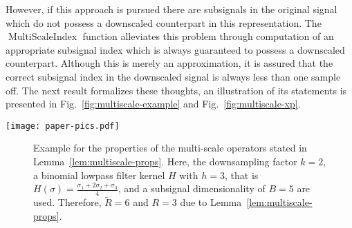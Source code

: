 \documentclass[journal]{IEEEtran}
\DeclareMathOperator{\Subsignal}{Subsignal}
\DeclareMathOperator{\SubsignalPad}{SubsignalPad}
\DeclareMathOperator{\MultiScaleSubsignal}{MultiScaleSubsignal}
\DeclareMathOperator{\MultiScaleIndex}{MultiScaleIndex}
\begin{document}
However, if this approach is pursued there are subsignals in the original signal which do not possess a downscaled counterpart in this representation.
The $\MultiScaleIndex$ function alleviates this problem through computation of an appropriate subsignal index which is always guaranteed to possess a downscaled counterpart.
Although this is merely an approximation, it is assured that the correct subsignal index in the downscaled signal is always less than one sample off.
The next result formalizes these thoughts, an illustration of its statements is presented in Fig.~\ref{fig:multiscale-example} and Fig.~\ref{fig:multiscale-xp}.

\begin{figure*}[t]
  \centering
  \texttt{[image: paper-pics.pdf]}
  \caption{Illustration of the multi-scale analysis approach detailed in Lemma~\ref{lem:multiscale-props} for image processing as an example.
    The original image (gray area on the left-hand side) is padded with $R$ pixels (orange area) using Neumann boundary conditions.
    Downscaling of the padded image with a scale factor of $k = 3$ yields the small image on the right-hand side.
    The red area in the original image is a region of interest with $B$ pixels in either dimension, it can be extracted conventionally using the $\Subsignal$ operator.
    The $\SubsignalPad$ operator extracts an extended region of interest with $B + 2R$ pixels in either dimension (yellow area), which provides more context than the original region of interest.
    If that extended region is downscaled, it is guaranteed by the choice of $R$ that the resulting signal possesses $B$ samples in either dimension.
    This downscaled, padded region is equivalent to application of the $\MultiScaleSubsignal$ operator.
    Its outcome can also be found in the downscaled, padded image (green area) if the indices are adjusted through the $\MultiScaleIndex$ function.
    Figure best viewed in color.}
  \label{fig:multiscale-example}
\end{figure*}\begin{figure}[p]
  \centering
  \caption{Example for the properties of the multi-scale operators stated in Lemma~\ref{lem:multiscale-props}.
    Here, the downsampling factor $k = 2$, a binomial lowpass filter kernel $H$ with $h = 3$, that is $H(\sigma) = \frac{\sigma_1 + 2\sigma_2 + \sigma_3}{4}$, and a subsignal dimensionality of $B = 5$ are used.
    Therefore, $\tilde{R} = 6$ and $R = 3$ due to Lemma~\ref{lem:multiscale-props}.
}
\end{figure}
\end{document}
